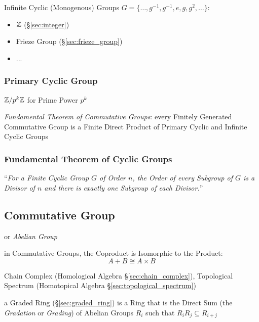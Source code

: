 Infinite Cyclic (Monogenous) Groups
$G = \{ \ldots, g^{-1}, g^{-1}, e, g, g^2, \ldots \}$:
\begin{itemize}
  \item $\mathbb{Z}$ (\S\ref{sec:integer})
  \item Frieze Group (\S\ref{sec:frieze_group})
  \item ...
\end{itemize}



\subsubsection{Primary Cyclic Group}\label{sec:primary_cyclic_group}

$\mathbb{Z}/p^k \mathbb{Z}$ for Prime Power $p^k$

\emph{Fundamental Theorem of Commutative Groups}: every Finitely Generated
Commutative Group is a Finite Direct Product of Primary Cyclic and Infinite
Cyclic Groups



\subsubsection{Fundamental Theorem of Cyclic Groups}
\label{sec:fundamental_cyclic_groups_theorem}

``\emph{For a Finite Cyclic Group $G$ of Order $n$, the Order of every
Subgroup of $G$ is a Divisor of $n$ and there is exactly one Subgroup of
each Divisor.}''



\subsection{Commutative Group}\label{sec:commutative_group}

or \emph{Abelian Group}

in Commutative Groups, the Coproduct is Isomorphic to the Product:
\[
  A + B \cong A \times B
\]

\fist Chain Complex (Homological Algebra \S\ref{sec:chain_complex}), Topological
Spectrum (Homotopical Algebra \S\ref{sec:topological_spectrum})

\fist a Graded Ring (\S\ref{sec:graded_ring}) is a Ring that is the Direct Sum
(the \emph{Gradation} or \emph{Grading}) of Abelian Groups $R_i$ such that
$R_iR_j \subseteq R_{i+j}$

